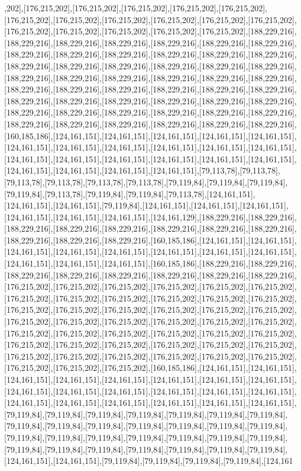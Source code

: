 ,202],[176,215,202],[176,215,202],[176,215,202],[176,215,202],[176,215,202],[176,215,202],[176,215,202],[176,215,202],[176,215,202],[176,215,202],[176,215,202],[176,215,202],[176,215,202],[176,215,202],[176,215,202],[176,215,202],[188,229,216],[188,229,216],[188,229,216],[188,229,216],[188,229,216],[188,229,216],[188,229,216],[188,229,216],[188,229,216],[188,229,216],[188,229,216],[188,229,216],[188,229,216],[188,229,216],[188,229,216],[188,229,216],[188,229,216],[188,229,216],[188,229,216],[188,229,216],[188,229,216],[188,229,216],[188,229,216],[188,229,216],[188,229,216],[188,229,216],[188,229,216],[188,229,216],[188,229,216],[188,229,216],[188,229,216],[188,229,216],[188,229,216],[188,229,216],[188,229,216],[188,229,216],[188,229,216],[188,229,216],[188,229,216],[188,229,216],[188,229,216],[188,229,216],[188,229,216],[188,229,216],[188,229,216],[188,229,216],[188,229,216],[188,229,216],[188,229,216],[160,185,186],[124,161,151],[124,161,151],[124,161,151],[124,161,151],[124,161,151],[124,161,151],[124,161,151],[124,161,151],[124,161,151],[124,161,151],[124,161,151],[124,161,151],[124,161,151],[124,161,151],[124,161,151],[124,161,151],[124,161,151],[124,161,151],[124,161,151],[124,161,151],[124,161,151],[79,113,78],[79,113,78],[79,113,78],[79,113,78],[79,113,78],[79,113,78],[79,119,84],[79,119,84],[79,119,84],[79,119,84],[79,113,78],[79,119,84],[79,119,84],[79,113,78],[124,161,151],[124,161,151],[124,161,151],[79,119,84],[124,161,151],[124,161,151],[124,161,151],[124,161,151],[124,161,151],[124,161,151],[124,161,129],[188,229,216],[188,229,216],[188,229,216],[188,229,216],[188,229,216],[188,229,216],[188,229,216],[188,229,216],[188,229,216],[188,229,216],[188,229,216],[160,185,186],[124,161,151],[124,161,151],[124,161,151],[124,161,151],[124,161,151],[124,161,151],[124,161,151],[124,161,151],[124,161,151],[124,161,151],[124,161,151],[160,185,186],[188,229,216],[188,229,216],[188,229,216],[188,229,216],[188,229,216],[188,229,216],[188,229,216],[188,229,216],[176,215,202],[176,215,202],[176,215,202],[176,215,202],[176,215,202],[176,215,202],[176,215,202],[176,215,202],[176,215,202],[176,215,202],[176,215,202],[176,215,202],[176,215,202],[176,215,202],[176,215,202],[176,215,202],[176,215,202],[176,215,202],[176,215,202],[176,215,202],[176,215,202],[176,215,202],[176,215,202],[176,215,202],[176,215,202],[176,215,202],[176,215,202],[176,215,202],[176,215,202],[176,215,202],[176,215,202],[176,215,202],[176,215,202],[176,215,202],[176,215,202],[176,215,202],[176,215,202],[176,215,202],[176,215,202],[176,215,202],[176,215,202],[176,215,202],[176,215,202],[176,215,202],[176,215,202],[160,185,186],[124,161,151],[124,161,151],[124,161,151],[124,161,151],[124,161,151],[124,161,151],[124,161,151],[124,161,151],[124,161,151],[124,161,151],[124,161,151],[124,161,151],[124,161,151],[124,161,151],[124,161,151],[124,161,151],[124,161,151],[124,161,151],[124,161,151],[124,161,151],[79,119,84],[79,119,84],[79,119,84],[79,119,84],[79,119,84],[79,119,84],[79,119,84],[79,119,84],[79,119,84],[79,119,84],[79,119,84],[79,119,84],[79,119,84],[79,119,84],[79,119,84],[79,119,84],[79,119,84],[79,119,84],[79,119,84],[79,119,84],[79,119,84],[79,119,84],[79,119,84],[79,119,84],[79,119,84],[79,119,84],[79,119,84],[79,119,84],[124,161,151],[124,161,151],[79,119,84],[79,119,84],[79,119,84],[79,119,84],[124,161